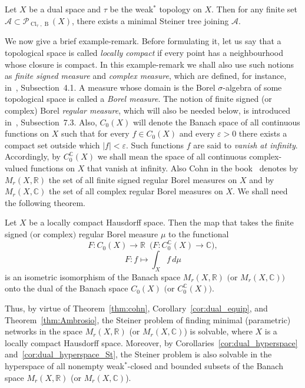\documentclass{svproc}
\def\Cl{\operatorname{Cl}}
\def\B{\operatorname{B}}
\begin{document}
\begin{corollary}\label{cor:dual_hyperspace_St}
Let $X$ be a dual space and $\tau$ be the weak$^*$ topology on $X$. Then for any finite set $\mathcal{A}\subset \mathcal{P}_{\Cl_{\tau}, \B}(X)$, there exists a minimal Steiner tree joining $\mathcal{A}$.
\end{corollary}

We now give a brief example-remark. Before formulating it, let us say that a topological space is called \textit{locally compact} if every point has a neighbourhood whose closure is compact. In this example-remark we shall also use such notions as \textit{finite signed measure} and \textit{complex measure}, which are defined, for instance, in~\cite{Cohn}, Subsection~4.1. A measure whose domain is the Borel $\sigma$-algebra of some topological space is called a \textit{Borel measure}. The notion of finite signed (or complex) Borel \textit{regular measure}, which will also be needed below, is introduced in~\cite{Cohn}, Subsection~7.3. Also, $C_0(X)$ will denote the Banach space of all continuous functions on $X$ such that for every $f\in C_0(X)$ and every $\varepsilon > 0$ there exists a compact set outside which $|f| < \varepsilon$. Such functions $f$ are said to \textit{vanish at infinity}. Accordingly, by $C_0^{\mathbb{C}}(X)$ we shall mean the space of all continuous complex-valued functions on $X$ that vanish at infinity. Also Cohn in the book~\cite{Cohn} denotes by $M_r(X,\mathbb{R})$ the set of all finite signed regular Borel measures on $X$ and by $M_r(X,\mathbb{C})$ the set of all complex regular Borel measures on $X$. We shall need the following theorem.

\begin{theorem}\label{thm:cohn}
Let $X$ be a locally compact Hausdorff space. Then the map that takes the finite signed $($or complex$)$ regular Borel measure $\mu$ to the functional 
$$F\colon C_0(X)\rightarrow \mathbb{R}\,\,\, \bigl(F\colon C_0^{\mathbb{C}}(X)\rightarrow \mathbb{C}\bigr),$$
$$F\colon f\mapsto \int_X f \,d\mu$$
is an isometric isomorphism of the Banach space $M_r(X,\mathbb{R})$ $\bigl($or $M_r(X,\mathbb{C})\bigr)$ onto the dual of the Banach space $C_0(X)$ $\bigl($or $C_0^{\mathbb{C}}(X)\bigr)$.
\end{theorem}

\begin{remark}
Thus, by virtue of Theorem~\ref{thm:cohn}, Corollary~\ref{cor:dual_equip}, and Theorem~\ref{thm:Ambrosio}, the Steiner problem of finding minimal (parametric) networks in the space $M_r(X,\mathbb{R})$ (or $M_r(X,\mathbb{C})$) is solvable, where $X$ is a locally compact Hausdorff space. Moreover, by Corollaries~\ref{cor:dual_hyperspace} and~\ref{cor:dual_hyperspace_St}, the Steiner problem is also solvable in the hyperspace of all nonempty weak$^*$-closed and bounded subsets of the Banach space $M_r(X,\mathbb{R})$ (or $M_r(X,\mathbb{C})$).
\end{remark}
\end{document}
